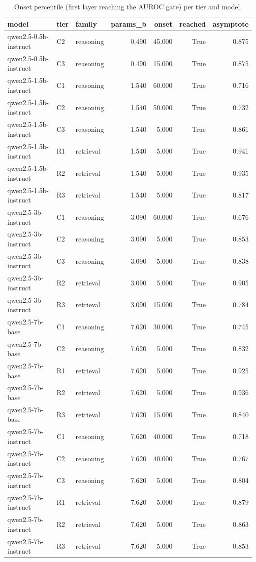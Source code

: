 \begin{table}
\caption{Onset percentile (first layer reaching the AUROC gate) per tier and model.}
\label{tab:t8_h4_depth_onsets}
\begin{tabular}{lllrrrr}
\toprule
model & tier & family & params\_b & onset & reached & asymptote \\
\midrule
qwen2.5-0.5b-instruct & C2 & reasoning & 0.490 & 45.000 & True & 0.875 \\
qwen2.5-0.5b-instruct & C3 & reasoning & 0.490 & 15.000 & True & 0.875 \\
qwen2.5-1.5b-instruct & C1 & reasoning & 1.540 & 60.000 & True & 0.716 \\
qwen2.5-1.5b-instruct & C2 & reasoning & 1.540 & 50.000 & True & 0.732 \\
qwen2.5-1.5b-instruct & C3 & reasoning & 1.540 & 5.000 & True & 0.861 \\
qwen2.5-1.5b-instruct & R1 & retrieval & 1.540 & 5.000 & True & 0.941 \\
qwen2.5-1.5b-instruct & R2 & retrieval & 1.540 & 5.000 & True & 0.935 \\
qwen2.5-1.5b-instruct & R3 & retrieval & 1.540 & 5.000 & True & 0.817 \\
qwen2.5-3b-instruct & C1 & reasoning & 3.090 & 60.000 & True & 0.676 \\
qwen2.5-3b-instruct & C2 & reasoning & 3.090 & 5.000 & True & 0.853 \\
qwen2.5-3b-instruct & C3 & reasoning & 3.090 & 5.000 & True & 0.838 \\
qwen2.5-3b-instruct & R2 & retrieval & 3.090 & 5.000 & True & 0.905 \\
qwen2.5-3b-instruct & R3 & retrieval & 3.090 & 15.000 & True & 0.784 \\
qwen2.5-7b-base & C1 & reasoning & 7.620 & 30.000 & True & 0.745 \\
qwen2.5-7b-base & C2 & reasoning & 7.620 & 5.000 & True & 0.832 \\
qwen2.5-7b-base & R1 & retrieval & 7.620 & 5.000 & True & 0.925 \\
qwen2.5-7b-base & R2 & retrieval & 7.620 & 5.000 & True & 0.936 \\
qwen2.5-7b-base & R3 & retrieval & 7.620 & 15.000 & True & 0.840 \\
qwen2.5-7b-instruct & C1 & reasoning & 7.620 & 40.000 & True & 0.718 \\
qwen2.5-7b-instruct & C2 & reasoning & 7.620 & 40.000 & True & 0.767 \\
qwen2.5-7b-instruct & C3 & reasoning & 7.620 & 5.000 & True & 0.804 \\
qwen2.5-7b-instruct & R1 & retrieval & 7.620 & 5.000 & True & 0.879 \\
qwen2.5-7b-instruct & R2 & retrieval & 7.620 & 5.000 & True & 0.863 \\
qwen2.5-7b-instruct & R3 & retrieval & 7.620 & 5.000 & True & 0.853 \\
\bottomrule
\end{tabular}
\end{table}

